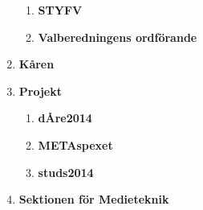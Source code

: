 \documentclass{protokoll}
\begin{document}
\begin{enumerate}
\begin{enumerate}
        \item \textbf{STYFV}
        \item \textbf{Valberedningens ordförande} 
      \end{enumerate}
    \item \textbf{Kåren}
    \item \textbf{Projekt}
      \begin{enumerate}
        \item \textbf{dÅre2014}
        \item \textbf{METAspexet}
        \item \textbf{studs2014}
      \end{enumerate}
    \item \textbf{Sektionen för Medieteknik}
  \end{enumerate}






\end{document}
